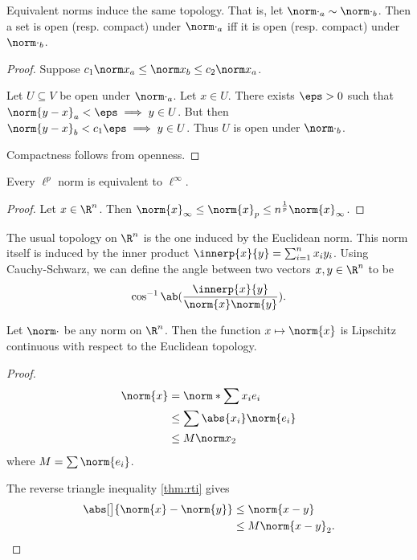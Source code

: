 \begin{proposition}
    Equivalent norms induce the same topology.
    That is, let ${\norm\cdot}_a \sim {\norm\cdot}_b$.
    Then a set is open (resp. compact) under ${\norm\cdot}_a$ iff it is
    open (resp. compact) under ${\norm\cdot}_b$.
\end{proposition}
\begin{proof}
    Suppose $c_1 {\norm x}_a \le {\norm x}_b \le c_2 {\norm x}_a$.

    Let $U \subseteq V$ be open under ${\norm\cdot}_a$.
    Let $x \in U$.
    There exists $\eps > 0$ such that
    ${\norm{y - x}}_a < \eps \implies y \in U$.
    But then ${\norm{y - x}}_b < c_1 \eps \implies y \in U$.
    Thus $U$ is open under ${\norm\cdot}_b$.

    Compactness follows from openness.
\end{proof}

\begin{proposition}
    Every $\ell^p$ norm is equivalent to $\ell^\infty$.
\end{proposition}
\begin{proof}
    Let $x \in \R^n$.
    Then $\norm{x}_\infty \le \norm{x}_p \le n^{\frac1p} \norm{x}_\infty$.
\end{proof}

The usual topology on $\R^n$ is the one induced by the Euclidean norm.
This norm itself is induced by the inner product
$\innerp{x}{y} = \sum_{i=1}^n x_i y_i$. %
Using Cauchy-Schwarz, we can define the angle between two vectors
$x, y \in \R^n$ to be \[
    \cos^{-1} \ab(\frac{\innerp{x}{y}}{\norm{x} \norm{y}}).
\]

\begin{proposition*} \label{thm:norm:cont}
    Let $\norm\cdot$ be any norm on $\R^n$.
    Then the function $x \mapsto \norm{x}$ is Lipschitz continuous
    with respect to the Euclidean topology.
\end{proposition*}
\begin{proof}
    \begin{align*}
        \norm{x} &= \norm*{\sum x_i e_i} \\
            &\le \sum \abs{x_i} \norm{e_i} \\
            &\le M {\norm x}_2
    \end{align*} where $M = \sum \norm{e_i}$.

    The reverse triangle inequality \cref{thm:rti} gives
    \begin{align*}
        \abs[\big]{\norm{x} - \norm{y}} &\le \norm{x - y} \\
            &\le M {\norm{x - y}}_2. \qedhere
    \end{align*}
\end{proof}

